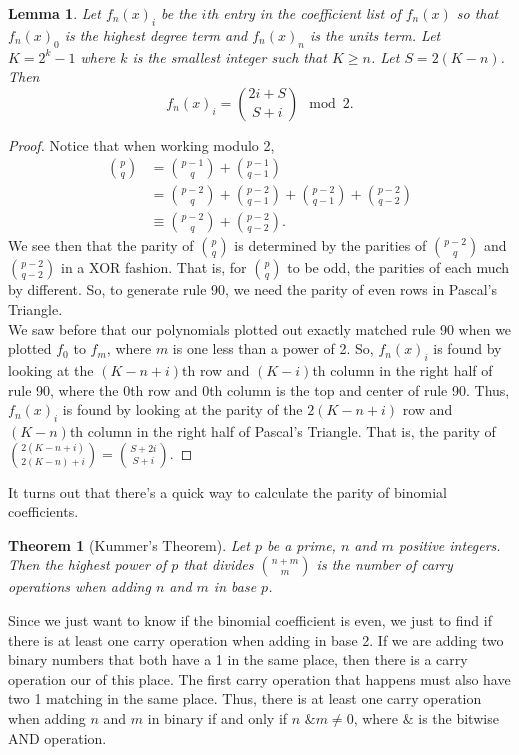 \documentclass[a4paper]{article}
\newtheorem{lemma}{Lemma}
\newtheorem{theorem}{Theorem}
\begin{document}
	\begin{lemma}
		Let $f_n(x)_i$ be the $i$th entry in the coefficient list of $f_n(x)$ so that $f_n(x)_0$ is the highest degree term and $f_n(x)_n$ is the units term.
		Let $K = 2^k - 1$ where $k$ is the smallest integer such that $K \geq n$.
		Let $S = 2(K-n)$.
		Then
		\begin{equation*}
			f_n(x)_i = \binom{2i + S}{S + i} \mod 2.
		\end{equation*}	
	\end{lemma}
	\begin{proof}
		Notice that when working modulo 2,
		\begin{align*}
			\binom{p}{q} &= \binom{p-1}{q} + \binom{p-1}{q-1} \\
				&= \binom{p-2}{q} + \binom{p-2}{q-1} + \binom{p-2}{q-1} + \binom{p-2}{q-2} \\
				&\equiv \binom{p-2}{q} + \binom{p-2}{q-2}.
		\end{align*}
		We see then that the parity of $\binom{p}{q}$ is determined by the parities of $\binom{p-2}{q}$ and $\binom{p-2}{q-2}$ in a XOR fashion.
		That is, for $\binom{p}{q}$ to be odd, the parities of each much by different.
		So, to generate rule 90, we need the parity of even rows in Pascal's Triangle. \\
		
		We saw before that our polynomials plotted out exactly matched rule 90 when we plotted $f_0$ to $f_m$, where $m$ is one less than a power of 2.
		So, $f_n(x)_i$ is found by looking at the $(K-n+i)$th row and $(K-i)$th column in the right half of rule 90, where the 0th row and 0th column is the top and center of rule 90.
		Thus, $f_n(x)_i$ is found by looking at the parity of the $2(K-n+i)$ row and $(K-n)$th column in the right half of Pascal's Triangle.
		That is, the parity of $\binom{2(K-n+i)}{2(K-n) + i} = \binom{S + 2i}{S + i}$.
	\end{proof}

	It turns out that there's a quick way to calculate the parity of binomial coefficients.
	\begin{theorem}[Kummer's Theorem]
		Let $p$ be a prime, $n$ and $m$ positive integers.
		Then the highest power of $p$ that divides $\binom{n+m}{m}$ is the number of carry operations when adding $n$ and $m$ in base $p$.
	\end{theorem}

	Since we just want to know if the binomial coefficient is even, we just to find if there is at least one carry operation when adding in base 2.
	If we are adding two binary numbers that both have a 1 in the same place, then there is a carry operation our of this place.
	The first carry operation that happens must also have two 1 matching in the same place.
	Thus, there is at least one carry operation when adding $n$ and $m$ in binary if and only if $n \texttt{ \& } m \neq 0$, where $\texttt{\&}$ is the bitwise AND operation.
	
\end{document}
